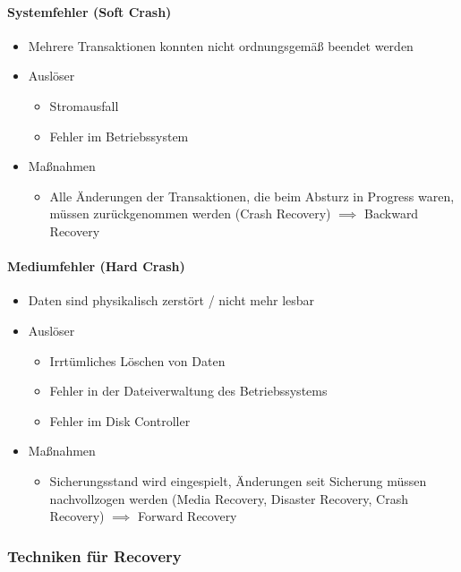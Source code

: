 \paragraph{Systemfehler (Soft Crash)}
\begin{itemize}
    \item Mehrere Transaktionen konnten nicht ordnungsgemäß beendet werden
    \item Auslöser
    \begin{itemize}
        \item Stromausfall
        \item Fehler im Betriebssystem
    \end{itemize}
    \item Maßnahmen
    \begin{itemize}
        \item Alle Änderungen der Transaktionen, die beim Absturz in Progress waren, müssen zurückgenommen werden (Crash Recovery) $\implies$ Backward Recovery
    \end{itemize}
\end{itemize}

\paragraph{Mediumfehler (Hard Crash)}
\begin{itemize}
    \item Daten sind physikalisch zerstört / nicht mehr lesbar
    \item Auslöser
    \begin{itemize}
        \item Irrtümliches Löschen von Daten
        \item Fehler in der Dateiverwaltung des Betriebssystems
        \item Fehler im Disk Controller
    \end{itemize}
    \item Maßnahmen
    \begin{itemize}
        \item Sicherungsstand wird eingespielt, Änderungen seit Sicherung müssen nachvollzogen werden (Media Recovery, Disaster Recovery, Crash Recovery) $\implies$ Forward Recovery
    \end{itemize}
\end{itemize}

\subsubsection{Techniken für Recovery}
